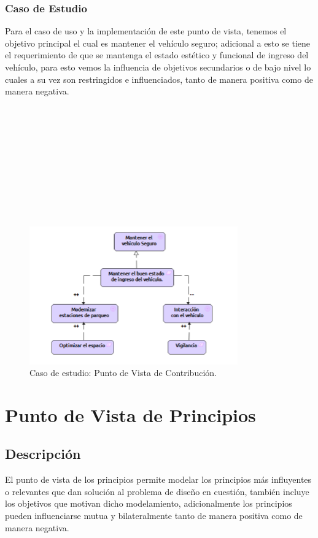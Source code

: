 \subsubsection{Caso de Estudio}
Para el caso de uso y la implementación de este punto de vista, tenemos el objetivo principal el cual es mantener el vehículo seguro; adicional a esto se tiene el requerimiento de que se mantenga el estado estético y funcional de ingreso del vehículo, para esto vemos la influencia de objetivos secundarios o de bajo nivel lo cuales a su vez son restringidos e influenciados, tanto de manera positiva como de manera negativa.
\\
\\
\\
\\
\\
\\
\\
\\
\\
\\
\\

\begin{figure}[h]
	\centering
	\includegraphics[width=0.8\textwidth]{imagenes/Caso_Estudio/Motivacion/Contribucion.PDF}
	\caption{Caso de estudio: Punto de Vista de Contribución.}
	\label{fig:gap_analysis}
\end{figure}

\section{Punto de Vista de Principios}
\subsection{Descripción}
El punto de vista de los principios permite modelar los principios más  influyentes o relevantes que dan  solución al problema de diseño en cuestión, también incluye los objetivos que motivan dicho modelamiento, adicionalmente los principios pueden influenciarse mutua y bilateralmente tanto de manera positiva como de manera negativa.
